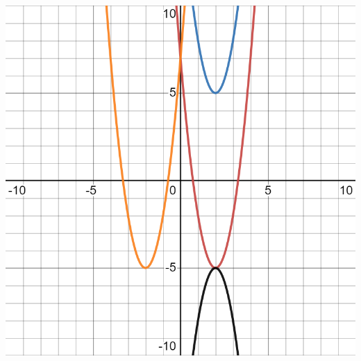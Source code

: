 \documentclass{ximera}
\begin{document}
\begin{exercise}
\begin{exercise}
\begin{exercise}
\begin{exercise}
\includegraphics[width=1\linewidth]{FT17graph.png}

\begin{multipleChoice}
\end{multipleChoice}

\end{exercise}
\end{exercise}
\end{exercise}
\end{exercise}
\end{document}
